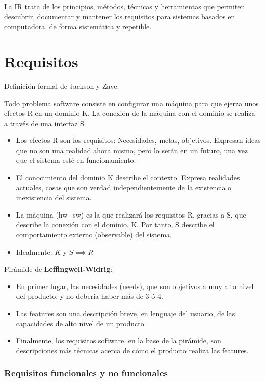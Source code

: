 
La IR trata de los principios, métodos, técnicas y herramientas que
permiten descubrir, documentar y mantener los requisitos para sistemas
basados en computadora, de forma sistemática y repetible.

\section{Requisitos}

Definición formal de Jackson y Zave:

Todo problema software consiste en configurar una máquina para que ejerza unos efectos R en
un dominio K. La conexión de la máquina con el dominio se realiza a través de una interfaz S.

\begin{itemize}[noitemsep]
\item Los efectos R son los requisitos: Necesidades, metas,
  objetivos. Expresan ideas que no son una realidad ahora mismo, pero
  lo serán en un futuro, una vez que el sistema esté en
  funcionamiento.
\item El conocimiento del dominio K describe el contexto. Expresa
  realidades actuales, cosas que son verdad independientemente de la
  existencia o inexistencia del sistema.
\item La máquina (hw+sw) es la que realizará los requisitos R, gracias
  a S, que describe la conexión con el dominio.  K. Por tanto, S
  describe el comportamiento externo (observable) del sistema.
\item Idealmente: $K$ y $S \implies R$
\end{itemize}

Pirámide de \textbf{Leffingwell-Widrig}:
\begin{itemize}[noitemsep]
\item En primer lugar, las necesidades (needs), que son
objetivos a muy alto nivel del producto, y no debería
haber más de 3 ó 4.
\item Las features son una descripción breve, en lenguaje del
usuario, de las capacidades de alto nivel de un producto.
\item Finalmente, los requisitos software, en la base de la
pirámide, son descripciones más técnicas acerca de cómo
el producto realiza las features.
\end{itemize}


\subsubsection{Requisitos funcionales y no funcionales}
\label{sec:requisitos:funcionales-nofuncionales}

